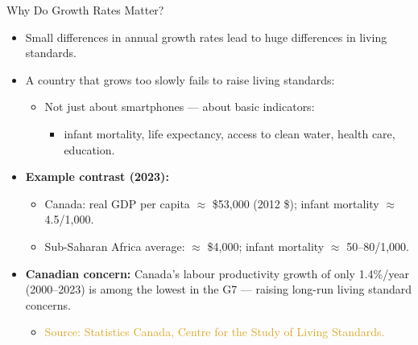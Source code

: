 \documentclass[aspectratio=169]{beamer}
\begin{document}
\begin{frame}{Why Do Growth Rates Matter?}
\transfade
\begin{itemize}[<+->]
  \item Small differences in annual growth rates lead to \alert{huge} differences in living standards.
  \item A country that grows too slowly fails to raise living standards:
  \begin{itemize}[<+->]
    \item Not just about smartphones --- about basic indicators:
    \begin{itemize}[<+->]
      \item infant mortality, life expectancy, access to clean water, health care, education.
    \end{itemize}
  \end{itemize}
  \item \textbf{Example contrast (2023):}
  \begin{itemize}[<+->]
    \item Canada: real GDP per capita $\approx$ \$53{,}000 (2012 \$); infant mortality $\approx$ 4.5/1{,}000.
    \item Sub-Saharan Africa average: $\approx$ \$4{,}000; infant mortality $\approx$ 50--80/1{,}000.
  \end{itemize}
  \item \textbf{Canadian concern:} Canada's labour productivity growth of only \alert{1.4\%/year} (2000--2023) is among the lowest in the G7 --- raising long-run living standard concerns.
  \begin{itemize}[<+->]
    \item \textcolor{goldenrod}{Source: Statistics Canada, Centre for the Study of Living Standards.}
  \end{itemize}
\end{itemize}
\end{frame}
\end{document}
